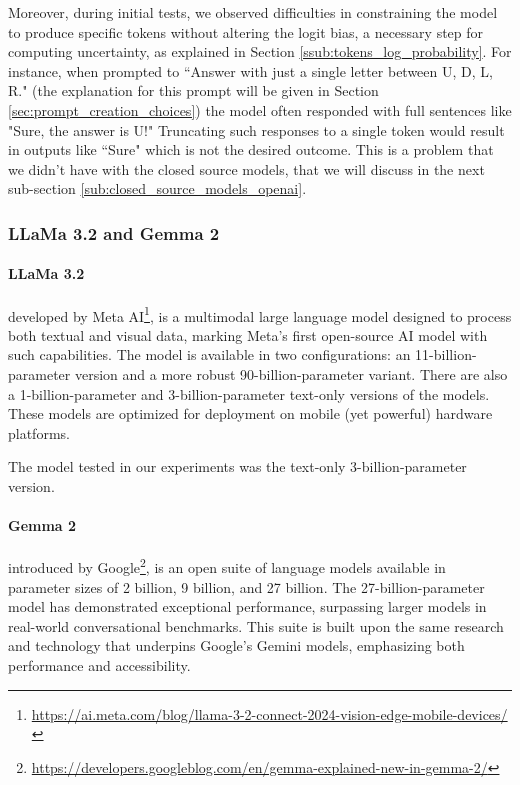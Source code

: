 Moreover, during initial tests, we observed difficulties in constraining the model
to produce specific tokens without altering the logit bias, a necessary step for
computing uncertainty, as explained in Section \ref{ssub:tokens_log_probability}.
For instance, when prompted to ``Answer with just a single letter between U, D, L,
R." (the explanation for this prompt will be given in Section \ref{sec:prompt_creation_choices})
the model often responded with full sentences like "Sure, the answer is U!"
Truncating such responses to a single token would result in outputs like ``Sure"
which is not the desired outcome. This is a problem that we didn't have with the
closed source models, that we will discuss in the next sub-section \ref{sub:closed_source_models_openai}.

\subsubsection{LLaMa 3.2 and Gemma 2}
\paragraph{LLaMa 3.2}
developed by Meta AI\footnote{\url{https://ai.meta.com/blog/llama-3-2-connect-2024-vision-edge-mobile-devices/}},
is a multimodal large language model designed to process both textual and visual
data, marking Meta's first open-source AI model with such capabilities. The
model is available in two configurations: an 11-billion-parameter version and a more
robust 90-billion-parameter variant. There are also a 1-billion-parameter and 3-billion-parameter
text-only versions of the models. These models are optimized for deployment on mobile
(yet powerful) hardware platforms.

The model tested in our experiments was the text-only 3-billion-parameter version.
\paragraph{Gemma 2}
introduced by Google\footnote{\url{https://developers.googleblog.com/en/gemma-explained-new-in-gemma-2/}},
is an open suite of language models available in parameter sizes of 2 billion, 9
billion, and 27 billion. The 27-billion-parameter model has demonstrated
exceptional performance, surpassing larger models in real-world conversational benchmarks.
This suite is built upon the same research and technology that underpins Google's
Gemini models, emphasizing both performance and accessibility.

